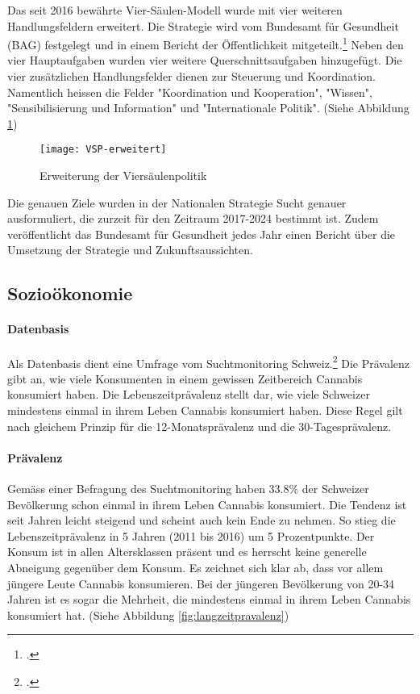 \documentclass[../main.tex]{subfiles}
\begin{document}
	\noindent
	Das seit 2016 bewährte Vier-Säulen-Modell wurde mit vier weiteren Handlungsfeldern erweitert. 
	Die Strategie wird vom Bundesamt für Gesundheit (BAG) festgelegt und in einem Bericht der Öffentlichkeit mitgeteilt.\footcite{bag-01}	
	Neben den vier Hauptaufgaben wurden vier weitere Querschnittsaufgaben hinzugefügt.
	Die vier zusätzlichen Handlungsfelder dienen zur Steuerung und Koordination.
	Namentlich heissen die Felder "Koordination und Kooperation", "Wissen", "Sensibilisierung und Information" und "Internationale Politik". (Siehe Abbildung \ref{fig:vsp})

	\noindent	 
	\begin{figure}[H]
		\centering
		\texttt{[image: VSP-erweitert]}
		\captionsetup{font=small}
		\caption[Erweiterung der Viersäulenpolitik]{Erweiterung der Viersäulenpolitik\protect\footnotemark}		
		\label{fig:vsp}
	\end{figure}
	
	\noindent
	Die genauen Ziele wurden in der Nationalen Strategie Sucht genauer ausformuliert, die zurzeit für den Zeitraum 2017-2024 bestimmt ist.
	Zudem veröffentlicht das Bundesamt für Gesundheit jedes Jahr einen Bericht über die Umsetzung der Strategie und Zukunftsaussichten.
	
	\subsection{Sozioökonomie}
	
	\paragraph{Datenbasis}
	Als Datenbasis dient eine Umfrage vom Suchtmonitoring Schweiz.\footcite{gmel}
	Die Prävalenz gibt an, wie viele Konsumenten in einem gewissen Zeitbereich Cannabis konsumiert haben.
	Die Lebenszeitprävalenz stellt dar, wie viele Schweizer mindestens einmal in ihrem Leben Cannabis konsumiert haben.
	Diese Regel gilt nach gleichem Prinzip für die 12-Monatsprävalenz und die 30-Tagesprävalenz.
	
	\paragraph{Prävalenz}	
	Gemäss einer Befragung des Suchtmonitoring haben 33.8\% der Schweizer Bevölkerung schon einmal in ihrem Leben Cannabis konsumiert.
	Die Tendenz ist seit Jahren leicht steigend und scheint auch kein Ende zu nehmen. 
	So stieg die Lebenszeitprävalenz in 5 Jahren (2011 bis 2016) um 5 Prozentpunkte. 
	Der Konsum ist in allen Altersklassen präsent und es herrscht keine generelle Abneigung gegenüber dem Konsum. 
	Es zeichnet sich klar ab, dass vor allem jüngere Leute Cannabis konsumieren. 
	Bei der jüngeren Bevölkerung von 20-34 Jahren ist es sogar die Mehrheit, die mindestens einmal in ihrem Leben Cannabis konsumiert hat.	
	(Siehe Abbildung \ref{fig:langzeitpravalenz})
	
\end{document}
